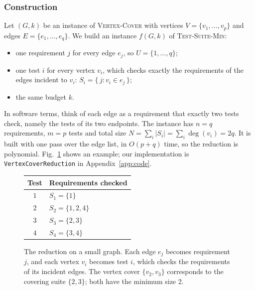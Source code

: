 \documentclass[conference]{IEEEtran}
\theoremstyle{definition}
\theoremstyle{remark}
\newcommand{\TSM}{\textsc{Test-Suite-Min}}
\newcommand{\VC}{\textsc{Vertex-Cover}}
\begin{document}
\subsubsection{Construction}
Let $(G, k)$ be an instance of \VC{} with vertices $V = \{v_1,\dots,v_p\}$ and
edges $E = \{e_1,\dots,e_q\}$. We build an instance $f(G,k)$ of \TSM{}:
\begin{itemize}
  \item one requirement $j$ for every edge $e_j$, so $U = \{1,\dots,q\}$;
  \item one test $i$ for every vertex $v_i$, which checks exactly the
        requirements of the edges incident to $v_i$:
        $S_i = \{\, j : v_i \in e_j \,\}$;
  \item the same budget $k$.
\end{itemize}
In software terms, think of each edge as a requirement that exactly two tests
check, namely the tests of its two endpoints.
The instance has $n = q$ requirements, $m = p$ tests and total size
$N = \sum_i |S_i| = \sum_i \deg(v_i) = 2q$. It is built with one pass over the
edge list, in $O(p + q)$ time, so the reduction is polynomial.
Fig.~\ref{fig:reduction} shows an example; our implementation is
\texttt{VertexCoverReduction} in Appendix~\ref{app:code}.

\begin{figure}[t]
\centering
\begin{minipage}{0.42\columnwidth}
\centering
{}
\end{minipage}%
\hfill
\begin{minipage}{0.55\columnwidth}
\centering\small
\begin{tabular}{@{}cl@{}}
\toprule
Test & Requirements checked \\
\midrule
$1$ & $S_1 = \{1\}$ \\
$2$ & $S_2 = \{1, 2, 4\}$ \\
$3$ & $S_3 = \{2, 3\}$ \\
$4$ & $S_4 = \{3, 4\}$ \\
\bottomrule
\end{tabular}
\end{minipage}
\caption{The reduction on a small graph. Each edge $e_j$ becomes requirement
$j$, and each vertex $v_i$ becomes test $i$, which checks the requirements of
its incident edges. The vertex cover $\{v_2, v_3\}$ corresponds to the covering
suite $\{2, 3\}$; both have the minimum size 2.}
\label{fig:reduction}
\end{figure}
\end{document}
